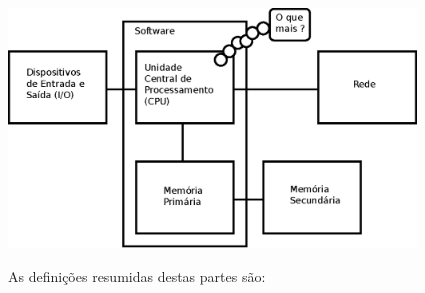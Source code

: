 \beforefig
\centerline{\includegraphics[height=2.50in]{figs2/arch.eps}}
\afterfig
%

As definições resumidas destas partes são:
%

